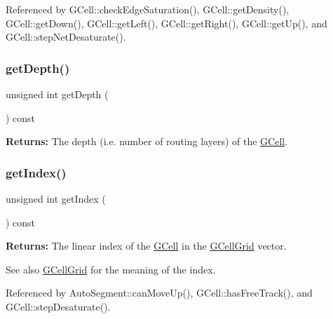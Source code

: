 Referenced by G\+Cell\+::check\+Edge\+Saturation(), G\+Cell\+::get\+Density(), G\+Cell\+::get\+Down(), G\+Cell\+::get\+Left(), G\+Cell\+::get\+Right(), G\+Cell\+::get\+Up(), and G\+Cell\+::step\+Net\+Desaturate().

\mbox{\label{classKatabatic_1_1GCell_a6c4d9081746b8daa3e45e5e3dd185b60}} 
\subsubsection{\texorpdfstring{get\+Depth()}{getDepth()}}
{\footnotesize\ttfamily unsigned int get\+Depth (\begin{DoxyParamCaption}{ }\end{DoxyParamCaption}) const\hspace{0.3cm}{\ttfamily [inline]}}

{\bfseries Returns\+:} The depth (i.\+e. number of routing layers) of the \mbox{\hyperlink{classKatabatic_1_1GCell}{G\+Cell}}. \mbox{\label{classKatabatic_1_1GCell_a762de91e7869ca544ff034b99fc2e0a6}} 
\subsubsection{\texorpdfstring{get\+Index()}{getIndex()}}
{\footnotesize\ttfamily unsigned int get\+Index (\begin{DoxyParamCaption}{ }\end{DoxyParamCaption}) const\hspace{0.3cm}{\ttfamily [inline]}}

{\bfseries Returns\+:} The linear index of the \mbox{\hyperlink{classKatabatic_1_1GCell}{G\+Cell}} in the \mbox{\hyperlink{classKatabatic_1_1GCellGrid}{G\+Cell\+Grid}} vector.

\begin{DoxySeeAlso}{See also}
\mbox{\hyperlink{classKatabatic_1_1GCellGrid}{G\+Cell\+Grid}} for the meaning of the index. 
\end{DoxySeeAlso}


Referenced by Auto\+Segment\+::can\+Move\+Up(), G\+Cell\+::has\+Free\+Track(), and G\+Cell\+::step\+Desaturate().

